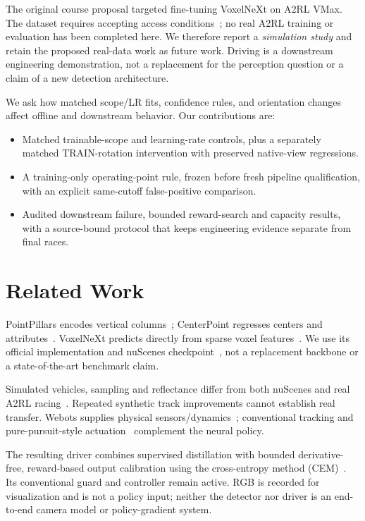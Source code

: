 \documentclass[conference]{IEEEtran}
\begin{document}
The original course proposal targeted fine-tuning VoxelNeXt on A2RL VMax. The dataset requires accepting access conditions~\cite{a2rlvmax}; no real A2RL training or evaluation has been completed here. We therefore report a \emph{simulation study} and retain the proposed real-data work as future work. Driving is a downstream engineering demonstration, not a replacement for the perception question or a claim of a new detection architecture.

We ask how matched scope/LR fits, confidence rules, and orientation changes affect offline and downstream behavior. Our contributions are:
\begin{itemize}
\item Matched trainable-scope and learning-rate controls, plus a separately matched TRAIN-rotation intervention with preserved native-view regressions.
\item A training-only operating-point rule, frozen before fresh pipeline qualification, with an explicit same-cutoff false-positive comparison.
\item Audited downstream failure, bounded reward-search and capacity results, with a source-bound protocol that keeps engineering evidence separate from final races.
\end{itemize}

\section{Related Work}
PointPillars encodes vertical columns~\cite{lang2019pointpillars}; CenterPoint regresses centers and attributes~\cite{yin2021centerpoint}. VoxelNeXt predicts directly from sparse voxel features~\cite{chen2023voxelnext}. We use its official implementation and nuScenes checkpoint~\cite{voxelnextcode,caesar2020nuscenes}, not a replacement backbone or a state-of-the-art benchmark claim.

Simulated vehicles, sampling and reflectance differ from both nuScenes and real A2RL racing~\cite{a2rlvmax}. Repeated synthetic track improvements cannot establish real transfer. Webots supplies physical sensors/dynamics~\cite{webots}; conventional tracking and pure-pursuit-style actuation~\cite{coulter1992pursuit} complement the neural policy.

The resulting driver combines supervised distillation with bounded derivative-free, reward-based output calibration using the cross-entropy method (CEM)~\cite{rubinstein1999cem,deboer2005cem}. Its conventional guard and controller remain active. RGB is recorded for visualization and is not a policy input; neither the detector nor driver is an end-to-end camera model or policy-gradient system.
\end{document}
